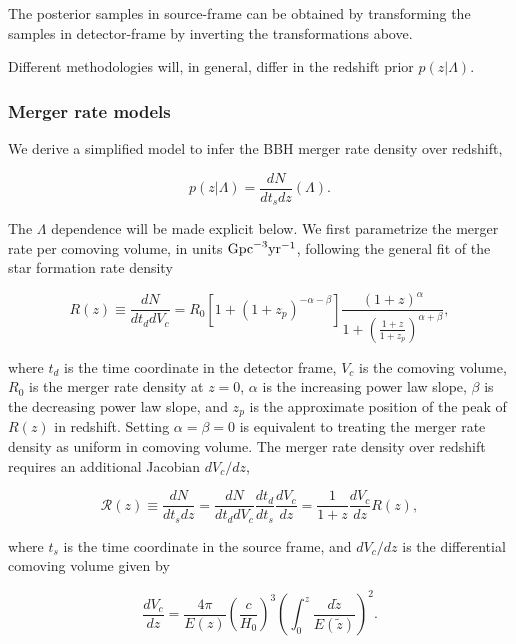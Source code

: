 \documentclass[%
preprint,
nofootinbib,
 amsmath,amssymb,
 aps,
]{revtex4-2}
\newcommand{\given}[2]{p( #1 | #2 )}
\newcommand{\be}{\begin{equation}}
\newcommand{\ee}{\end{equation}}
\newcommand{\pa}[1]{\left(#1\right)}
\begin{document}
The posterior samples in source-frame can be obtained by transforming the samples in detector-frame
by inverting the transformations above.

Different methodologies will, in general, differ in the redshift prior $\given{z}{\Lambda}$.

\subsubsection{Merger rate models}
\label{sec:framework:merger-rate-models}

We derive a simplified model to infer the BBH merger rate density over redshift,

\be
\given{z}{\Lambda} = \frac{dN}{dt_s dz}(\Lambda).
\ee

The $\Lambda$ dependence will be made explicit below. We first parametrize the merger rate per
comoving volume, in units $\rm{Gpc}^{-3} \rm{yr}^{-1}$, following the general fit of the star
formation rate density~\cite{Madau:2014bja}

\begin{equation}
	R(z) \equiv \frac{dN}{dt_d dV_c} = R_0 [1 + (1 + z_p)^{-\alpha -\beta}]\frac{(1 + z)^{\alpha}}{1 + \left ( \frac{1 + z}{1 + z_p} \right)^{\alpha + \beta}},
\end{equation}

where $t_d$ is the time coordinate in the detector frame, $V_c$ is the comoving volume, $R_0$ is
the merger rate density at $z=0$, $\alpha$ is the increasing power law slope, $\beta$ is the
decreasing power law slope, and $z_p$ is the approximate position of the peak of $R(z)$ in
redshift. Setting $\alpha = \beta = 0$ is equivalent to treating the merger rate density as uniform
in comoving volume. The merger rate density over redshift requires an additional Jacobian
$dV_c/dz$,

\begin{equation}
	\mathcal{R}(z) \equiv \frac{dN}{dt_s dz} = \frac{dN}{dt_d dV_c} \frac{dt_d}{dt_s} \frac{dV_c}{dz} = \frac{1}{1 + z} \frac{dV_c}{dz} R(z),
\end{equation}

where $t_s$ is the time coordinate in the source frame, and $dV_c /dz$ is the differential comoving
volume given by

\begin{equation}
	\frac{dV_c}{dz} =  \frac{4 \pi }{E(z)}\pa{\frac{c}{H_0}}^3 \pa{\int_0^z \frac{d\tilde{z}}{E(\tilde{z})}}^2.
\end{equation}
\end{document}
